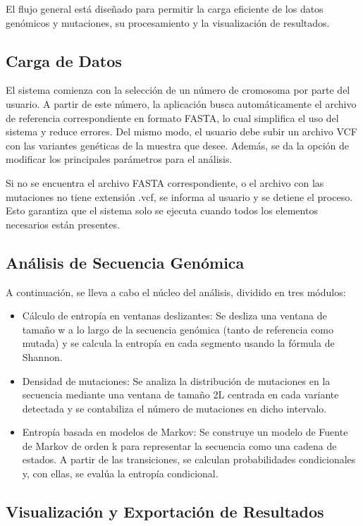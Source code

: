 \documentclass[11pt,spanish,listoffigures,listoftables]{tfgetsinf}
\begin{document}
El flujo general está diseñado para permitir la carga eficiente de los datos genómicos y mutaciones, su procesamiento y la visualización de resultados. 

\subsection{Carga de Datos}

El sistema comienza con la selección de un número de cromosoma por parte del usuario. A partir de este número, la aplicación busca automáticamente el archivo de referencia correspondiente en formato FASTA, lo cual simplifica el uso del sistema y reduce errores. Del mismo modo, el usuario debe subir un archivo VCF con las variantes genéticas de la muestra que desee. Además, se da la opción de modificar los principales parámetros para el análisis. 

Si no se encuentra el archivo FASTA correspondiente, o el archivo con las mutaciones no tiene extensión .vcf, se informa al usuario y se detiene el proceso. Esto garantiza que el sistema solo se ejecuta cuando todos los elementos necesarios están presentes. 

\subsection{Análisis de Secuencia Genómica}

A continuación, se lleva a cabo el núcleo del análisis, dividido en tres módulos: 


\begin{itemize}
   \item Cálculo de entropía en ventanas deslizantes: Se desliza una ventana de tamaño w a lo largo de la secuencia genómica (tanto de referencia como mutada) y se calcula la entropía en cada segmento usando la fórmula de Shannon. 
   \item Densidad de mutaciones: Se analiza la distribución de mutaciones en la secuencia mediante una ventana de tamaño 2L centrada en cada variante detectada y se contabiliza el número de mutaciones en dicho intervalo. 
   \item Entropía basada en modelos de Markov: Se construye un modelo de Fuente de Markov de orden k para representar la secuencia como una cadena de estados. A partir de las transiciones, se calculan probabilidades condicionales y, con ellas, se evalúa la entropía condicional. 
\end{itemize}

\subsection{Visualización y Exportación de Resultados }
\end{document}
